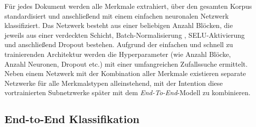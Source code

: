 \documentclass[bachelor,german]{info1thesis}
\begin{document}
%
Für jedes Dokument werden alle Merkmale extrahiert, über den gesamten Korpus standardisiert und anschließend mit einem einfachen neuronalen Netzwerk klassifiziert. Das Netzwerk besteht aus einer beliebigen Anzahl Blöcken, die jeweils aus einer verdeckten Schicht, Batch-Normalisierung \cite{Ioffe2015}, SELU-Aktivierung \cite{Klambauer2017} und anschließend Dropout \cite{Srivastava2014} bestehen. Aufgrund der einfachen und schnell zu trainierenden Architektur werden die Hyperparameter (wie Anzahl Blöcke, Anzahl Neuronen, Dropout etc.) mit einer umfangreichen Zufallssuche ermittelt. Neben einem Netzwerk mit der Kombination aller Merkmale existieren separate Netzwerke für alle Merkmalstypen alleinstehend, mit der Intention diese vortrainierten Subnetzwerke später mit dem \textit{End-To-End}-Modell zu kombinieren.
%
\subsection{End-to-End Klassifikation}
%
\end{document}
